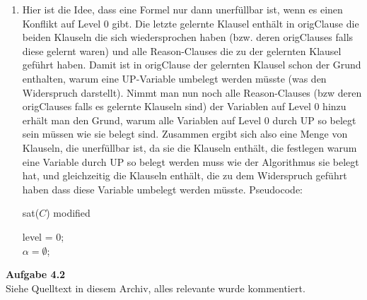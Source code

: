 \documentclass[a4paper,10pt]{article}
\begin{document}
\begin{enumerate}
\item Hier ist die Idee, dass eine Formel nur dann unerfüllbar ist, wenn es einen Konflikt auf Level 0 gibt. Die letzte gelernte Klausel enthält in origClause die beiden Klauseln die sich wiedersprochen haben (bzw. deren origClauses falls diese gelernt waren) und alle Reason-Clauses die zu der gelernten Klausel geführt haben. Damit ist in origClause der gelernten Klausel schon der Grund enthalten, warum eine UP-Variable umbelegt werden müsste (was den Widerspruch darstellt). Nimmt man nun noch alle Reason-Clauses (bzw deren origClauses falls es gelernte Klauseln sind) der Variablen auf Level 0 hinzu erhält man den Grund, warum alle Variablen auf Level 0 durch UP so belegt sein müssen wie sie belegt sind. Zusammen ergibt sich also eine Menge von Klauseln, die unerfüllbar ist, da sie die Klauseln enthält, die festlegen warum eine Variable durch UP so belegt werden muss wie der Algorithmus sie belegt hat, und gleichzeitig die Klauseln enthält, die zu dem Widerspruch geführt haben dass diese Variable umbelegt werden müsste. Pseudocode: \\
\begin{algorithm}[H]
	\caption{sat($C$) modified}
	level = 0;\\
	$\alpha = \emptyset$;\\
\end{algorithm}
\end{enumerate}


\noindent\textbf{Aufgabe 4.2}\\\smallskip
Siehe Quelltext in diesem Archiv, alles relevante wurde kommentiert. 
\end{document}
